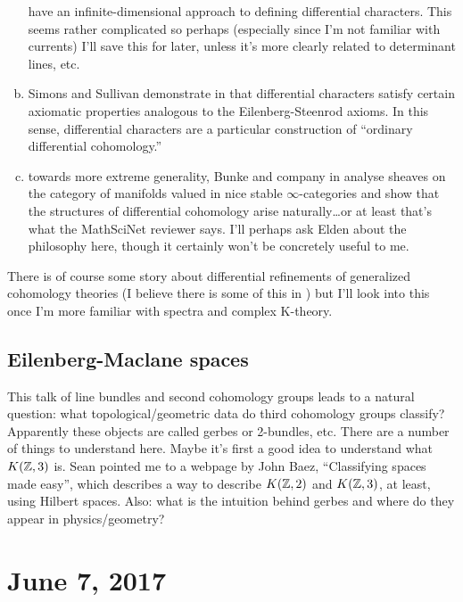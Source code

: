 \documentclass{amsart}
\begin{document}
\begin{enumerate}[(a)]
        have an infinite-dimensional approach to defining differential characters. This seems rather
        complicated so perhaps (especially since I'm not familiar with currents) I'll save this for
        later, unless it's more clearly related to determinant lines, etc.
    \item Simons and Sullivan demonstrate in \cite{simons-sullivan} that differential characters
        satisfy certain axiomatic properties analogous to the Eilenberg-Steenrod axioms. In
        this sense, differential characters are a particular construction of ``ordinary
        differential cohomology.''
    \item towards more extreme generality, Bunke and company in \cite{bnv} analyse sheaves
        on the category of manifolds valued in nice stable $\infty$-categories and show that
        the structures of differential cohomology arise naturally\ldots or at least that's
        what the MathSciNet reviewer says. I'll perhaps ask Elden about the philosophy here,
        though it certainly won't be concretely useful to me.
\end{enumerate}

There is of course some story about differential refinements of generalized cohomology
theories (I believe there is some of this in \cite{hopkins-singer}) but I'll look into this
once I'm more familiar with spectra and complex K-theory.

\subsection{Eilenberg-Maclane spaces}
This talk of line bundles and second cohomology groups leads to a natural question: what
topological/geometric data do third cohomology groups classify? Apparently these objects
are called gerbes or 2-bundles, etc. There are a number of things to understand here. Maybe
it's first a good idea to understand what $K(\mathbb{Z}, 3)$ is. Sean pointed me to a webpage by
John Baez, ``Classifying spaces made easy'', which describes a way to describe $K(\mathbb{Z}, 2)$
and $K(\mathbb{Z}, 3)$, at least, using Hilbert spaces. Also: what is the intuition behind gerbes
and where do they appear in physics/geometry?


\section{June 7, 2017}
\end{document}
